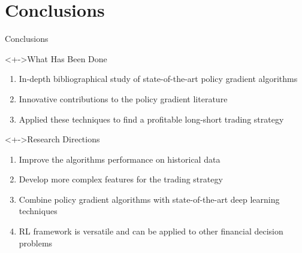 \section{Conclusions}

\begin{frame}{Conclusions}
	\begin{block}<+->{What Has Been Done}
		\begin{enumerate}
			\item In-depth bibliographical study of state-of-the-art policy gradient algorithms
			\item<+-> Innovative contributions to the policy gradient literature
			\item<+-> Applied these techniques to find a profitable long-short trading strategy		
		\end{enumerate}
	\end{block}
	
	\begin{block}<+->{Research Directions}
		\begin{enumerate}
			\item Improve the algorithms performance on historical data
			\item<+-> Develop more complex features for the trading strategy
			\item<+-> Combine policy gradient algorithms with state-of-the-art deep learning techniques
			\item<+-> RL framework is versatile and can be applied to other financial decision problems
		\end{enumerate}
	\end{block}
\end{frame}


